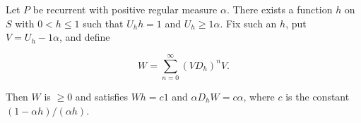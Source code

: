Let $P$ be recurrent with positive regular measure $\alpha$. There exists a function $h$ on $S$ with $0 < h \leq 1$ such that $U_h h = 1$ and $U_h \geq 1\alpha$. Fix such an $h$, put $V = U_h - 1\alpha$, and define

$$W = \sum_{n=0}^{\infty} (V D_h)^n V.$$

Then $W$ is $\geq 0$ and satisfies $W h = c 1$ and $\alpha D_h W = c \alpha$, where $c$ is the constant $(1 - \alpha h)/(\alpha h)$.
